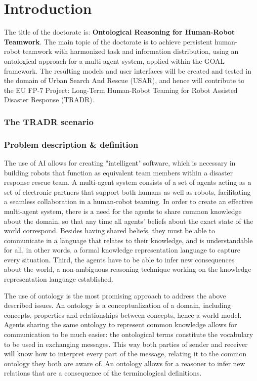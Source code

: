 \chapter{Introduction}
The title of the doctorate is: \textbf{Ontological Reasoning for Human-Robot Teamwork}.
The main topic of the doctorate is to achieve persistent human-robot teamwork with harmonized task and information distribution, using an ontological approach for a multi-agent system, applied within the GOAL framework. The resulting models and user interfaces will be created and tested in the domain of Urban Search And Rescue (USAR), and hence will contribute to the EU FP-7 Project: Long-Term Human-Robot Teaming for Robot Assisted Disaster Response (TRADR).




\subsection{The TRADR scenario}

\subsection{Problem description & definition}

The use of AI allows for creating "intelligent" software, which is necessary in building robots that function as equivalent team members within a disaster response rescue team. A multi-agent system consists of a set of agents acting as a set of electronic partners that support both humans as well as robots, facilitating a seamless collaboration in a human-robot teaming. In order to create an effective multi-agent system, there is a need for the agents to share common knowledge about the domain, so that any time all agents' beliefs about the exact state of the world correspond. Besides having shared
beliefs, they must be able to communicate in a language that relates to their knowledge, and is understandable for all, in other words, a formal knowledge representation language to capture every situation. Third, the agents have to be able to infer new consequences about the world, a non-ambiguous reasoning technique working on the knowledge representation language established.

The use of ontology is the most promising approach to address the above described issues. An ontology is a conceptualization of a domain, including concepts, properties and relationships between concepts, hence a world model. Agents sharing the same ontology to represent common knowledge allows for communication to be much easier: the ontological terms constitute
the vocabulary to be used in exchanging messages. This way both parties of sender and receiver will know how to interpret every part of the message, relating it to the common ontology they both are aware of. An ontology
allows for a reasoner to infer new relations that are a consequence of the terminological definitions.

